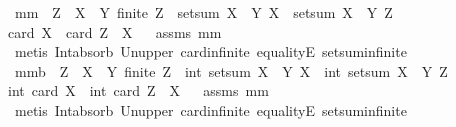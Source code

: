 \begin{isabellebody}
\endisatagproof
{\isafoldproof}%
%
\isadelimproof
\isanewline
%
\endisadelimproof
\isanewline
{}\isamarkupfalse%
\ mm{}{}{\isacharcolon}\ \ {\isachardoublequoteopen}Z\ {\isasymsubseteq}\ X\ {\isasymunion}\ Y{\isachardoublequoteclose}\ {\isachardoublequoteopen}finite\ Z{\isachardoublequoteclose}\ \ {\isachardoublequoteopen}{\isacharparenleft}setsum\ {\isacharparenleft}X\ {\isacharless}{\isacharbar}\ Y{\isacharparenright}\ X{\isacharparenright}\ {\isacharminus}\ {\isacharparenleft}setsum\ {\isacharparenleft}X\ {\isacharless}{\isacharbar}\ Y{\isacharparenright}\ Z{\isacharparenright}\ {\isacharequal}\isanewline
card\ X\ {\isacharminus}\ card\ {\isacharparenleft}Z\ {\isasyminter}\ X{\isacharparenright}{\isachardoublequoteclose}%
\isadelimproof
\ %
\endisadelimproof
%
\isatagproof
{}\isamarkupfalse%
\ assms\ mm{}{}\ \isamarkupfalse%
\ {\isacharparenleft}metis\ Int{\isacharunderscore}absorb{}\ Un{\isacharunderscore}upper{}\ card{\isacharunderscore}infinite\ equalityE\ setsum{\isachardot}infinite{\isacharparenright}%
\endisatagproof
{\isafoldproof}%
%
\isadelimproof
%
\endisadelimproof
\isanewline
\isanewline
{}\isamarkupfalse%
\ mm{}{}b{\isacharcolon}\ \ {\isachardoublequoteopen}Z\ {\isasymsubseteq}\ X\ {\isasymunion}\ Y{\isachardoublequoteclose}\ {\isachardoublequoteopen}finite\ Z{\isachardoublequoteclose}\ \ {\isachardoublequoteopen}int\ {\isacharparenleft}setsum\ {\isacharparenleft}X\ {\isacharless}{\isacharbar}\ Y{\isacharparenright}\ X{\isacharparenright}\ {\isacharminus}\ int\ {\isacharparenleft}setsum\ {\isacharparenleft}X\ {\isacharless}{\isacharbar}\ Y{\isacharparenright}\ Z{\isacharparenright}\ {\isacharequal}\isanewline
int\ {\isacharparenleft}card\ X{\isacharparenright}\ {\isacharminus}\ int\ {\isacharparenleft}card\ {\isacharparenleft}Z\ {\isasyminter}\ X{\isacharparenright}{\isacharparenright}{\isachardoublequoteclose}%
\isadelimproof
\ %
\endisadelimproof
%
\isatagproof
{}\isamarkupfalse%
\ assms\ mm{}{}\ \isamarkupfalse%
\ {\isacharparenleft}metis\ Int{\isacharunderscore}absorb{}\ Un{\isacharunderscore}upper{}\ card{\isacharunderscore}infinite\ equalityE\ setsum{\isachardot}infinite{\isacharparenright}%
\endisatagproof
{\isafoldproof}%
%
\isadelimproof
%
\endisadelimproof
\isanewline
\isanewline
{}\isamarkupfalse%

\end{isabellebody}
